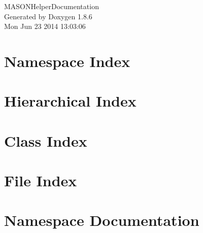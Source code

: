 \documentclass[twoside]{book}
\newcommand{\clearemptydoublepage}{%
  \newpage{\pagestyle{empty}\cleardoublepage}%
}
\begin{document}
\hypersetup{pageanchor=false}
\begin{titlepage}
\vspace*{7cm}
\begin{center}%
{\Large M\-A\-S\-O\-N\-Helper\-Documentation }\\
\vspace*{1cm}
{\large Generated by Doxygen 1.8.6}\\
\vspace*{0.5cm}
{\small Mon Jun 23 2014 13:03:06}\\
\end{center}
\end{titlepage}
\clearemptydoublepage
\tableofcontents
\clearemptydoublepage
{}
\hypersetup{pageanchor=true}

\chapter{Namespace Index}

\chapter{Hierarchical Index}

\chapter{Class Index}

\chapter{File Index}

\chapter{Namespace Documentation}














\end{document}
